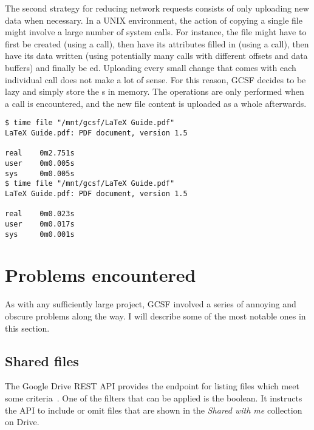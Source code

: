 The second strategy for reducing network requests consists of only uploading new data when necessary. In a UNIX environment, the action of copying a single file might involve a large number of system calls. For instance, the file might have to first be created (using a  call), then have its attributes filled in (using a  call), then have its data written (using potentially many  calls with different offsets and data buffers) and finally be ed. Uploading every small change that comes with each individual  call does not make a lot of sense. For this reason, GCSF decides to be lazy and simply store the s in memory. The operations are only performed when a  call is encountered, and the new file content is uploaded as a whole afterwards.


\begin{lstlisting}[basicstyle=\footnotesize\ttfamily,float,caption=File caching in action, frame=single, label=file_caching]
$ time file "/mnt/gcsf/LaTeX Guide.pdf"
LaTeX Guide.pdf: PDF document, version 1.5

real    0m2.751s
user    0m0.005s
sys     0m0.005s
$ time file "/mnt/gcsf/LaTeX Guide.pdf"
LaTeX Guide.pdf: PDF document, version 1.5

real    0m0.023s
user    0m0.017s
sys     0m0.001s
\end{lstlisting}

\section{Problems encountered} \label{problems_encountered}

As with any sufficiently large project, GCSF involved a series of annoying and obscure problems along the way. I will describe some of the most notable ones in this section.

\subsection{Shared files} \label{shared_files}

The Google Drive REST API provides the  endpoint for listing files which meet some criteria~\cite{files_list_call}. One of the filters that can be applied is the  boolean. It instructs the API to include or omit files that are shown in the \emph{Shared with me} collection on Drive.

